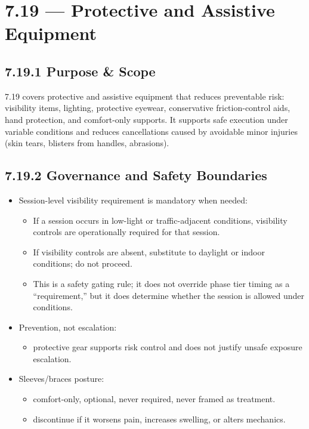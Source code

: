 \documentclass[10pt]{article}
\begin{document}
\section*{7.19 — Protective and Assistive Equipment}
{}

\subsection*{7.19.1 Purpose \& Scope}
{}

7.19 covers protective and assistive equipment that reduces preventable risk: visibility items, lighting, protective eyewear, conservative friction-control aids, hand protection, and comfort-only supports. It supports safe execution under variable conditions and reduces cancellations caused by avoidable minor injuries (skin tears, blisters from handles, abrasions).

\subsection*{7.19.2 Governance and Safety Boundaries}
{}

\begin{itemize}
\item Session-level visibility requirement is mandatory when needed:
  \begin{itemize}
  \item If a session occurs in low-light or traffic-adjacent conditions, visibility controls are operationally required for that session.
  \item If visibility controls are absent, substitute to daylight or indoor conditions; do not proceed.
  \item This is a safety gating rule; it does not override phase tier timing as a “requirement,” but it does determine whether the session is allowed under conditions.
  \end{itemize}
\item Prevention, not escalation:
  \begin{itemize}
  \item protective gear supports risk control and does not justify unsafe exposure escalation.
  \end{itemize}
\item Sleeves/braces posture:
  \begin{itemize}
  \item comfort-only, optional, never required, never framed as treatment.
  \item discontinue if it worsens pain, increases swelling, or alters mechanics.
  \end{itemize}
\end{itemize}
\end{document}
